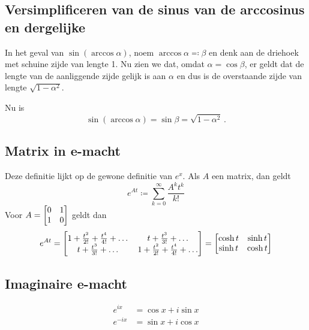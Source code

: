 \subsection{Versimplificeren van de sinus van de arccosinus en dergelijke}\label{subsec:versimplificerenVanDeSinusVanDeArccosinusEnDergelijke}
In het geval van $\sin (\arccos \alpha)$, noem $\arccos \alpha \eqqcolon \beta$ en denk aan de driehoek met schuine zijde van lengte 1.
Nu zien we dat, omdat $\alpha = \cos \beta$, er geldt dat de lengte van de aanliggende zijde gelijk is aan $\alpha$ en dus is de overstaande zijde van lengte $\sqrt{1-\alpha^2}$.
Nu is
\[ \sin (\arccos \alpha) = \sin \beta = \sqrt{1-\alpha^2}\,. \]
\subsection{Matrix in e-macht}\label{subsec:matrixInE-macht}
Deze definitie lijkt op de gewone definitie van $e^x$.
Als $A$ een matrix, dan geldt
\[ e^{At} \coloneqq \sum_{k=0}^\infty \frac{A^k t^k}{k!} \]
Voor $\displaystyle A = \matrix{0 & 1 \\ 1 & 0}$ geldt dan
\[ e^{At} =
\matrix{1 + \frac{t^2}{2!} + \frac{t^4}{4!} + \dots & t + \frac{t^3}{3!} + \dots \\
t + \frac{t^3}{3!} + \dots & 1 + \frac{t^2}{2!} + \frac{t^4}{4!} + \dots}
= \matrix{\cosh t & \sinh t \\ \sinh t & \cosh t}\]
\subsection{Imaginaire e-macht}\label{subsec:imaginaireE-macht}
\begin{align*}
	e^{ix} &= \cos x + i \sin x \\
	e^{-ix} &= \sin x + i \cos x
\end{align*}